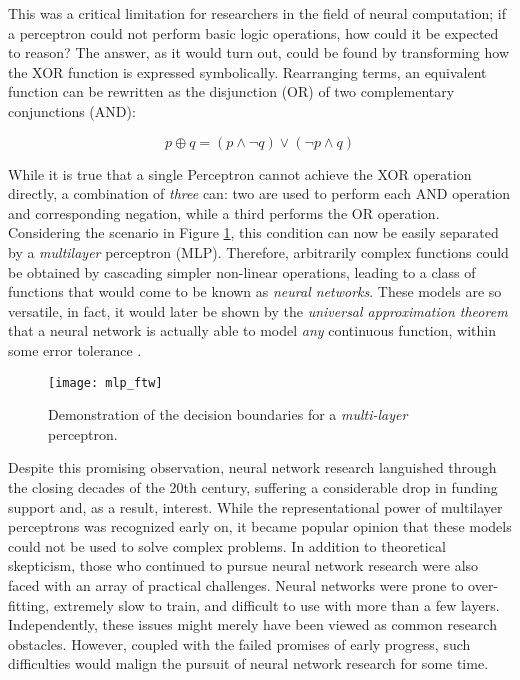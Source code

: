 This was a critical limitation for researchers in the field of neural computation; if a perceptron could not perform basic logic operations, how could it be expected to reason?
The answer, as it would turn out, could be found by transforming how the XOR function is expressed symbolically.
Rearranging terms, an equivalent function can be rewritten as the disjunction (OR) of two complementary conjunctions (AND):

\begin{equation}
\label{eq:xor}
p \oplus q = (p \wedge \neg q) \vee (\neg p \wedge q)
\end{equation}

\noindent While it is true that a single Perceptron cannot achieve the XOR operation directly, a combination of \emph{three} can: two are used to perform each AND operation and corresponding negation, while a third performs the OR operation.
Considering the scenario in Figure \ref{fig:mlp_ftw}, this condition can now be easily separated by a \emph{multilayer} perceptron (MLP).
Therefore, arbitrarily complex functions could be obtained by cascading simpler non-linear operations, leading to a class of functions that would come to be known as \emph{neural networks}.
These models are so versatile, in fact, it would later be shown by the \emph{universal approximation theorem} that a neural network is actually able to model \emph{any} continuous function, within some error tolerance \cite{Cybenko1989Approximation, Hornik1991Approximation}.

\begin{figure}
\begin{centering}
\texttt{[image: mlp\_ftw]}
\caption{Demonstration of the decision boundaries for a \emph{multi-layer} perceptron.}
\label{fig:mlp_ftw}
\end{centering}
\end{figure}

Despite this promising observation, neural network research languished through the closing decades of the 20th century, suffering a considerable drop in funding support and, as a result, interest.
While the representational power of multilayer perceptrons was recognized early on, it became popular opinion that these models could not be used to solve complex problems.
In addition to theoretical skepticism, those who continued to pursue neural network research were also faced with an array of practical challenges.
Neural networks were prone to over-fitting, extremely slow to train, and difficult to use with more than a few layers.
Independently, these issues might merely have been viewed as common research obstacles.
However, coupled with the failed promises of early progress, such difficulties would malign the pursuit of neural network research for some time.


